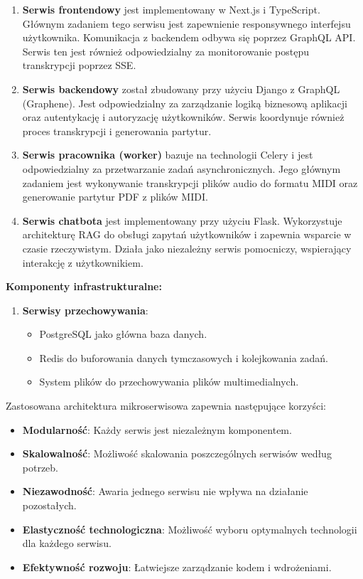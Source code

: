\documentclass[a4paper,twoside,12pt]{book}
\begin{document}
\begin{enumerate}
	\item \textbf{Serwis frontendowy} jest implementowany w Next.js i TypeScript. Głównym zadaniem tego serwisu jest zapewnienie responsywnego interfejsu użytkownika. Komunikacja z backendem odbywa się poprzez GraphQL API. Serwis ten jest również odpowiedzialny za monitorowanie postępu transkrypcji poprzez SSE.
 
	\item \textbf{Serwis backendowy} został zbudowany przy użyciu Django z GraphQL (Graphene). Jest odpowiedzialny za zarządzanie logiką biznesową aplikacji oraz autentykację i autoryzację użytkowników. Serwis koordynuje również proces transkrypcji i generowania partytur.
 
	\item \textbf{Serwis pracownika (worker)} bazuje na technologii Celery i jest odpowiedzialny za przetwarzanie zadań asynchronicznych. Jego głównym zadaniem jest wykonywanie transkrypcji plików audio do formatu MIDI oraz generowanie partytur PDF z plików MIDI.
 
	\item \textbf{Serwis chatbota} jest implementowany przy użyciu Flask. Wykorzystuje architekturę RAG do obsługi zapytań użytkowników i zapewnia wsparcie w czasie rzeczywistym. Działa jako niezależny serwis pomocniczy, wspierający interakcję z użytkownikiem.
 \end{enumerate}

\textbf{Komponenty infrastrukturalne:}

\begin{enumerate}
   \item \textbf{Serwisy przechowywania}:
   \begin{itemize}
       \item PostgreSQL jako główna baza danych.
       \item Redis do buforowania danych tymczasowych i kolejkowania zadań.
       \item System plików do przechowywania plików multimedialnych.
   \end{itemize}
\end{enumerate}

Zastosowana architektura mikroserwisowa zapewnia następujące korzyści:

\begin{itemize}
   \item \textbf{Modularność}: Każdy serwis jest niezależnym komponentem.
   \item \textbf{Skalowalność}: Możliwość skalowania poszczególnych serwisów według potrzeb.
   \item \textbf{Niezawodność}: Awaria jednego serwisu nie wpływa na działanie pozostałych.
   \item \textbf{Elastyczność technologiczna}: Możliwość wyboru optymalnych technologii dla każdego serwisu.
   \item \textbf{Efektywność rozwoju}: Łatwiejsze zarządzanie kodem i wdrożeniami.
\end{itemize}
\end{document}
